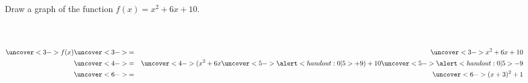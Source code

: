 \begin{frame}
\begin{example}[Example 2, p. 39]
Draw a graph of the function $f(x) = x^2 + 6x + 10$.
\begin{columns}[c]
\ %
%
%
\begin{eqnarray*}
\uncover<3->{f(x)} & \uncover<3->{ = } & \uncover<3->{x^2 + 6x + 10} \\
& \uncover<4->{ = } & \uncover<4->{(x^2 + 6x \uncover<5->{\alert<handout:0| 5>{+ 9}}) + 10 \uncover<5->{\alert<handout:0| 5>{- 9}}} \\
 & \uncover<6->{ = } & \uncover<6->{(x + 3)^2 + 1} \\
\end{eqnarray*}
\end{columns}
\end{example}
\end{frame}
